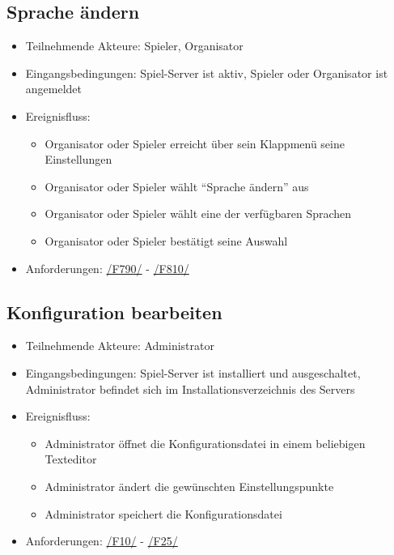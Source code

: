 \documentclass[a4paper]{scrreprt}
\begin{document}
    \subsection{Sprache ändern}
    \begin{itemize}
    \item Teilnehmende Akteure: \Gls{Spieler}, \Gls{Organisator}
    \item Eingangsbedingungen: \Gls{Spiel-Server} ist aktiv, \Gls{Spieler} oder \Gls{Organisator} ist angemeldet
    \item Ereignisfluss:
        \begin{itemize}
            \item \Gls{Organisator} oder \Gls{Spieler} erreicht über sein Klappmenü seine Einstellungen
            \item \Gls{Organisator} oder \Gls{Spieler} wählt \enquote{Sprache ändern} aus
            \item \Gls{Organisator} oder \Gls{Spieler} wählt eine der verfügbaren Sprachen
            \item \Gls{Organisator} oder \Gls{Spieler} bestätigt seine Auswahl
        \end{itemize}
        \item Anforderungen: \hyperlink{F790}{/F790/} - \hyperlink{F810}{/F810/}
    \end{itemize}

    \subsection{Konfiguration bearbeiten}
    \begin{itemize}
        \item Teilnehmende Akteure: \Gls{Administrator}
        \item Eingangsbedingungen: \Gls{Spiel-Server} ist installiert und ausgeschaltet, \Gls{Administrator} befindet sich im Installationsverzeichnis des Servers
        \item Ereignisfluss:
            \begin{itemize}
                \item \Gls{Administrator} öffnet die Konfigurationsdatei in einem beliebigen Texteditor
                \item \Gls{Administrator} ändert die gewünschten Einstellungspunkte
                \item \Gls{Administrator} speichert die Konfigurationsdatei
            \end{itemize}
        \item Anforderungen: \hyperlink{F10}{/F10/} - \hyperlink{F25}{/F25/}
    \end{itemize}
\end{document}
